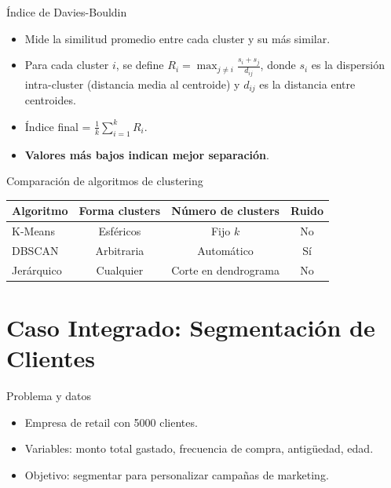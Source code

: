 \documentclass[aspectratio=169, 10pt, xcolor=table]{beamer}
\begin{document}
\begin{frame}{Índice de Davies-Bouldin}
    \begin{itemize}
        \item Mide la similitud promedio entre cada cluster y su más similar.
        \item Para cada cluster $i$, se define $R_i = \max_{j \neq i} \frac{s_i + s_j}{d_{ij}}$, donde $s_i$ es la dispersión intra-cluster (distancia media al centroide) y $d_{ij}$ es la distancia entre centroides.
        \item Índice final = $\frac{1}{k}\sum_{i=1}^k R_i$.
        \item \textbf{Valores más bajos indican mejor separación}.
    \end{itemize}
\end{frame}

\begin{frame}{Comparación de algoritmos de clustering}
    \begin{table}
        \centering
        \begin{tabular}{l|c|c|c}
            \toprule
            \textbf{Algoritmo} & \textbf{Forma clusters} & \textbf{Número de clusters} & \textbf{Ruido} \\
            \midrule
            K-Means & Esféricos & Fijo $k$ & No \\
            DBSCAN & Arbitraria & Automático & Sí \\
            Jerárquico & Cualquier & Corte en dendrograma & No \\
            \bottomrule
        \end{tabular}
    \end{table}
\end{frame}

\section{Caso Integrado: Segmentación de Clientes}

\begin{frame}{Problema y datos}
    \begin{itemize}
        \item Empresa de retail con 5000 clientes.
        \item Variables: monto total gastado, frecuencia de compra, antigüedad, edad.
        \item Objetivo: segmentar para personalizar campañas de marketing.
    \end{itemize}
\end{frame}
\end{document}
